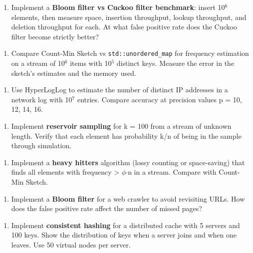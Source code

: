 \begin{enumerate}
\item Implement a \textbf{Bloom filter vs Cuckoo filter benchmark}: insert 10$^{6}$ elements, then measure space, insertion throughput, lookup throughput, and deletion throughput for each. At what false positive rate does the Cuckoo filter become strictly better?
\end{enumerate}

\begin{enumerate}
\item Compare Count-Min Sketch vs \texttt{std::unordered\_map} for frequency estimation on a stream of 10$^{6}$ items with 10$^{5}$ distinct keys. Measure the error in the sketch's estimates and the memory used.
\end{enumerate}

\begin{enumerate}
\item Use HyperLogLog to estimate the number of distinct IP addresses in a network log with 10$^{7}$ entries. Compare accuracy at precision values p = 10, 12, 14, 16.
\end{enumerate}

\begin{enumerate}
\item Implement \textbf{reservoir sampling} for k = 100 from a stream of unknown length. Verify that each element has probability k/n of being in the sample through simulation.
\end{enumerate}

\begin{enumerate}
\item Implement a \textbf{heavy hitters} algorithm (lossy counting or space-saving) that finds all elements with frequency > $\phi $$\cdot $n in a stream. Compare with Count-Min Sketch.
\end{enumerate}

\begin{enumerate}
\item Implement a \textbf{Bloom filter} for a web crawler to avoid revisiting URLs. How does the false positive rate affect the number of missed pages?
\end{enumerate}

\begin{enumerate}
\item Implement \textbf{consistent hashing} for a distributed cache with 5 servers and 100 keys. Show the distribution of keys when a server joins and when one leaves. Use 50 virtual nodes per server.
\end{enumerate}

